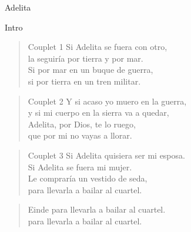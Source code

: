 \begin{song}{Adelita}

\begin{instrumental}{Intro}
 \measure{}  \measure{}  \measure{}  
 \measure{}  \measure{}  \measure{}  
\end{instrumental}

\begin{verse}{Couplet 1}
Si Adelita se fuera con otro,\\
la seguir\'ia por tierra y por mar.\\
Si por mar en un buque de guerra,\\
si por tierra en un tren militar.\\
\end{verse}

\begin{verse}{Couplet 2}
Y si acaso yo muero en la guerra,\\
y si mi cuerpo en la sierra va a quedar,\\
Adelita, por Dios, te lo ruego,\\
que por mi no vayas a llorar.\\
\end{verse}

\begin{verse}{Couplet 3}
Si Adelita quisiera ser mi esposa.\\
Si Adelita se fuera mi mujer.\\
Le comprar\'ia un vestido de seda,\\
para llevarla a bailar al cuartel.\\
\end{verse}

\begin{verse}{Einde}
para llevarla a bailar al cuartel.\\
para llevarla a bailar al cuartel.\\
\end{verse}
\end{song}

